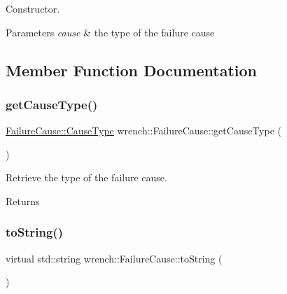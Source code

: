 Constructor. 


\begin{DoxyParams}{Parameters}
{\em cause} & the type of the failure cause \\
\hline
\end{DoxyParams}


\subsection{Member Function Documentation}
\mbox{\label{classwrench_1_1_failure_cause_a24fa4deecfa2e5e187f8d88187b8dddb}} 
\subsubsection{\texorpdfstring{get\+Cause\+Type()}{getCauseType()}}
{\footnotesize\ttfamily \hyperlink{classwrench_1_1_failure_cause_a6d06d6845ca5499c5cbbd9e1a08c9c77}{Failure\+Cause\+::\+Cause\+Type} wrench\+::\+Failure\+Cause\+::get\+Cause\+Type (\begin{DoxyParamCaption}{ }\end{DoxyParamCaption})}



Retrieve the type of the failure cause. 

\begin{DoxyReturn}{Returns}

\end{DoxyReturn}
\mbox{\label{classwrench_1_1_failure_cause_afbad248ebe902409f2cd4f1d6f2b867d}} 
\subsubsection{\texorpdfstring{to\+String()}{toString()}}
{\footnotesize\ttfamily virtual std\+::string wrench\+::\+Failure\+Cause\+::to\+String (\begin{DoxyParamCaption}{ }\end{DoxyParamCaption})\hspace{0.3cm}{\ttfamily [pure virtual]}}



